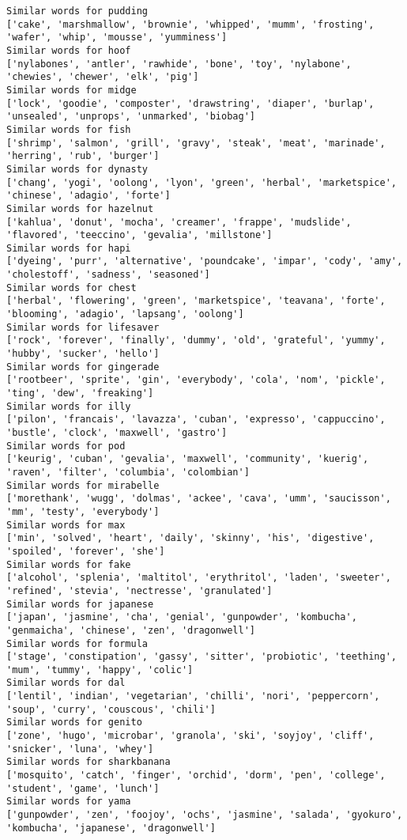 \documentclass[11pt]{article}
\begin{document}
\begin{Verbatim}[commandchars=\\\{\}]
Similar words for pudding
['cake', 'marshmallow', 'brownie', 'whipped', 'mumm', 'frosting', 'wafer', 'whip', 'mousse', 'yumminess']
Similar words for hoof
['nylabones', 'antler', 'rawhide', 'bone', 'toy', 'nylabone', 'chewies', 'chewer', 'elk', 'pig']
Similar words for midge
['lock', 'goodie', 'composter', 'drawstring', 'diaper', 'burlap', 'unsealed', 'unprops', 'unmarked', 'biobag']
Similar words for fish
['shrimp', 'salmon', 'grill', 'gravy', 'steak', 'meat', 'marinade', 'herring', 'rub', 'burger']
Similar words for dynasty
['chang', 'yogi', 'oolong', 'lyon', 'green', 'herbal', 'marketspice', 'chinese', 'adagio', 'forte']
Similar words for hazelnut
['kahlua', 'donut', 'mocha', 'creamer', 'frappe', 'mudslide', 'flavored', 'teeccino', 'gevalia', 'millstone']
Similar words for hapi
['dyeing', 'purr', 'alternative', 'poundcake', 'impar', 'cody', 'amy', 'cholestoff', 'sadness', 'seasoned']
Similar words for chest
['herbal', 'flowering', 'green', 'marketspice', 'teavana', 'forte', 'blooming', 'adagio', 'lapsang', 'oolong']
Similar words for lifesaver
['rock', 'forever', 'finally', 'dummy', 'old', 'grateful', 'yummy', 'hubby', 'sucker', 'hello']
Similar words for gingerade
['rootbeer', 'sprite', 'gin', 'everybody', 'cola', 'nom', 'pickle', 'ting', 'dew', 'freaking']
Similar words for illy
['pilon', 'francais', 'lavazza', 'cuban', 'expresso', 'cappuccino', 'bustle', 'clock', 'maxwell', 'gastro']
Similar words for pod
['keurig', 'cuban', 'gevalia', 'maxwell', 'community', 'kuerig', 'raven', 'filter', 'columbia', 'colombian']
Similar words for mirabelle
['morethank', 'wugg', 'dolmas', 'ackee', 'cava', 'umm', 'saucisson', 'mm', 'testy', 'everybody']
Similar words for max
['min', 'solved', 'heart', 'daily', 'skinny', 'his', 'digestive', 'spoiled', 'forever', 'she']
Similar words for fake
['alcohol', 'splenia', 'maltitol', 'erythritol', 'laden', 'sweeter', 'refined', 'stevia', 'nectresse', 'granulated']
Similar words for japanese
['japan', 'jasmine', 'cha', 'genial', 'gunpowder', 'kombucha', 'genmaicha', 'chinese', 'zen', 'dragonwell']
Similar words for formula
['stage', 'constipation', 'gassy', 'sitter', 'probiotic', 'teething', 'mum', 'tummy', 'happy', 'colic']
Similar words for dal
['lentil', 'indian', 'vegetarian', 'chilli', 'nori', 'peppercorn', 'soup', 'curry', 'couscous', 'chili']
Similar words for genito
['zone', 'hugo', 'microbar', 'granola', 'ski', 'soyjoy', 'cliff', 'snicker', 'luna', 'whey']
Similar words for sharkbanana
['mosquito', 'catch', 'finger', 'orchid', 'dorm', 'pen', 'college', 'student', 'game', 'lunch']
Similar words for yama
['gunpowder', 'zen', 'foojoy', 'ochs', 'jasmine', 'salada', 'gyokuro', 'kombucha', 'japanese', 'dragonwell']

\end{Verbatim}
\end{document}
